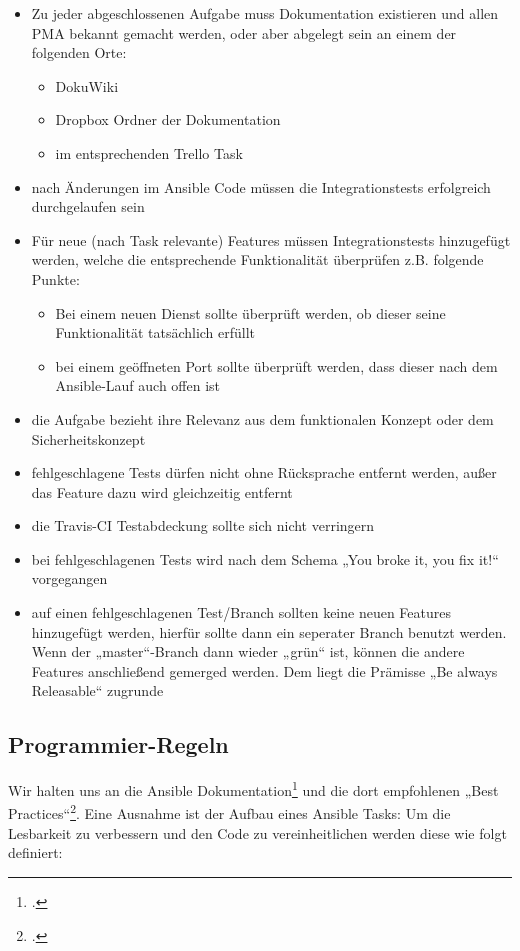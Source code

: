 \begin{itemize}
\item Zu jeder abgeschlossenen Aufgabe muss Dokumentation existieren und allen PMA bekannt gemacht werden, oder aber abgelegt sein an einem der folgenden Orte:
\begin{itemize}
\item DokuWiki
\item Dropbox Ordner der Dokumentation
\item im entsprechenden Trello Task
\end{itemize}
\item nach Änderungen im Ansible Code müssen die Integrationstests erfolgreich durchgelaufen sein
\item Für neue (nach Task relevante) Features müssen Integrationstests hinzugefügt werden, welche die entsprechende Funktionalität überprüfen z.B. folgende Punkte:
\begin{itemize}
\item Bei einem neuen Dienst sollte überprüft werden, ob dieser seine Funktionalität tatsächlich erfüllt
\item bei einem geöffneten Port sollte überprüft werden, dass dieser nach dem Ansible-Lauf auch offen ist
\end{itemize}
\item die Aufgabe bezieht ihre Relevanz aus dem funktionalen Konzept oder dem Sicherheitskonzept
\item fehlgeschlagene Tests dürfen nicht ohne Rücksprache entfernt werden, außer das Feature dazu wird gleichzeitig entfernt
\item die Travis-CI Testabdeckung sollte sich nicht verringern
\item bei fehlgeschlagenen Tests wird nach dem Schema „You broke it, you fix it!“ vorgegangen
\item auf einen fehlgeschlagenen Test/Branch sollten keine neuen Features hinzugefügt werden, hierfür sollte dann ein seperater Branch benutzt werden. Wenn der „master“-Branch dann wieder „grün“ ist, können die andere Features anschließend gemerged werden. Dem liegt die Prämisse „Be always Releasable“ zugrunde
\end{itemize}

\subsection{Programmier-Regeln}
Wir halten uns an die Ansible Dokumentation\footcite{ansible} und die dort empfohlenen „Best Practices“\footcite{ansibleBestPractices}. Eine Ausnahme ist der Aufbau eines Ansible Tasks: Um die Lesbarkeit zu verbessern und den Code zu vereinheitlichen werden diese wie folgt definiert:

